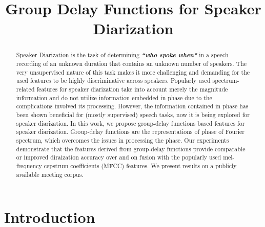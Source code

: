 \documentclass[conference]{IEEEtran}
\begin{document}
\title{Group Delay Functions for Speaker Diarization}

\author{
}

\maketitle


\begin{abstract}

Speaker Diarization is the task of determining {\bf\textit{``who spoke when"}} in a speech recording of an unknown duration that contains an unknown number of speakers. The very unsupervised nature of this task makes it more challenging and demanding for the used features to be highly discriminative across speakers. Popularly used spectrum-related features for speaker diarization take into account merely the magnitude information and do not utilize information embedded in phase due to the complications involved its processing. However, the information contained in phase has been shown beneficial for (mostly supervised) speech tasks, now it is being explored for speaker diarization. In this work, we propose group-delay functions based features for speaker diarization. Group-delay functions are the representations of phase of Fourier spectrum, which overcomes the issues in processing the phase. Our experiments demonstrate that the features derived from group-delay functions provide comparable or improved diraization accuracy over and on fusion with the popularly used mel-frequency cepstrum coefficients (MFCC) features. We present results on a publicly available meeting corpus. \\

\end{abstract}
\IEEEpeerreviewmaketitle



\section{Introduction}
\label{intro}
\end{document}
